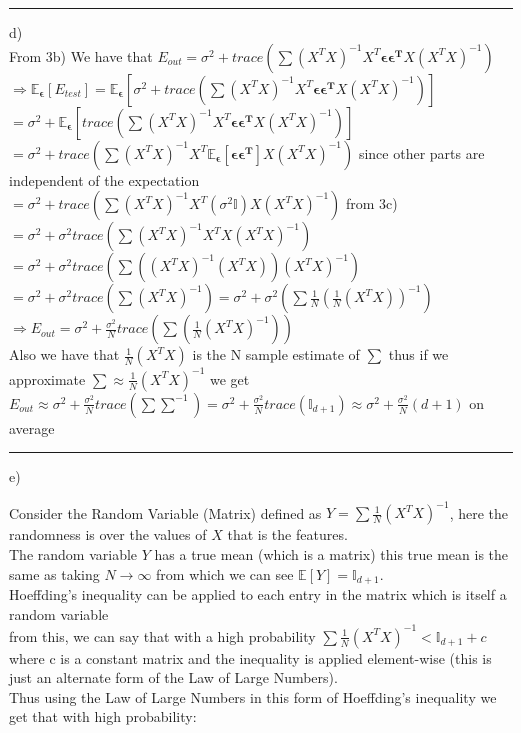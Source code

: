 \documentclass{article}
\begin{document}
 \par\noindent\rule{\textwidth}{0.4pt}

d) \\ 

From 3b) We have that $E_{out} = \sigma ^2 + trace(\sum (X^TX)^{-1}X^T \bm{\epsilon} \bm{\epsilon^T}X(X^TX)^{-1})$ \\ 
$ \Rightarrow \mathbb{E}_{\bm{\epsilon}}[E_{test}] = \mathbb{E}_{\bm{\epsilon}}[\sigma^2  + trace(\sum (X^TX)^{-1}X^T \bm{\epsilon} \bm{\epsilon^T}X(X^TX)^{-1})]$
$ = \sigma^2 + \mathbb{E}_{\bm{\epsilon}}[trace(\sum (X^TX)^{-1}X^T \bm{\epsilon} \bm{\epsilon^T}X(X^TX)^{-1})]$
\\  $ = \sigma^2 + trace(\sum  (X^TX)^{-1}X^T \mathbb{E}_{\bm{\epsilon}}[\bm{\epsilon}\bm{\epsilon^T}]X(X^TX)^{-1} )$ since other parts are independent of the expectation \\ 
$ = \sigma^2 + trace( \sum (X^TX)^{-1}X^T(\sigma^2\mathbb{I})X(X^TX)^{-1})$ from 3c) \\
$ = \sigma^2 + \sigma^2 trace(\sum (X^TX)^{-1}X^TX(X^TX)^{-1})$ \\ 
$ = \sigma^2 + \sigma^2trace(\sum((X^TX)^{-1}(X^TX))(X^TX)^{-1})$
\\
$ = \sigma^2 + \sigma^2trace(\sum(X^TX)^{-1}) = \sigma^2 + \sigma^2(\sum \frac{1}{N} (\frac{1}{N}(X^TX))^{-1})$
\\
$ \Rightarrow E_{out} = \sigma^2 + \frac{\sigma^2}{N} trace(\sum(\frac{1}{N}(X^TX)^{-1}))$
\\
Also we have that $\frac{1}{N}(X^TX)$ is the N sample estimate of $\sum$ thus if we approximate $\sum \approx \frac{1}{N}(X^TX)^{-1}$ we get $E_{out} \approx \sigma^2 + \frac{\sigma^2}{N}trace(\sum \sum ^{-1}) = \sigma^2 + \frac{\sigma^2}{N}trace(\mathbb{I}_{d+1}) \approx \sigma^2 + \frac{\sigma^2}{N}(d+1)$ on average 

 \par\noindent\rule{\textwidth}{0.4pt}

e)

Consider the Random Variable (Matrix) defined as $Y=\sum \frac{1}{N}(X^TX)^{-1}$, here the randomness is over the values of $X$ that is the features. 
\\
The random variable $Y$ has a true mean (which is a matrix) this true mean is the same as taking $ N \rightarrow \infty $ from which we can see $\mathbb{E}[Y] = \mathbb{I}_{d+1}$. \\
Hoeffding's inequality can be applied to each entry in the matrix which is itself a random variable \\ 
from this, we can say that with a high probability $\sum \frac{1}{N} (X^TX)^{-1} < \mathbb{I}_{d+1} + c $ where c is a constant matrix and the inequality is applied element-wise (this is just an alternate form of the Law of Large Numbers). \\
Thus using the Law of Large Numbers in this form of Hoeffding's inequality 
we get that with high probability:
\end{document}
